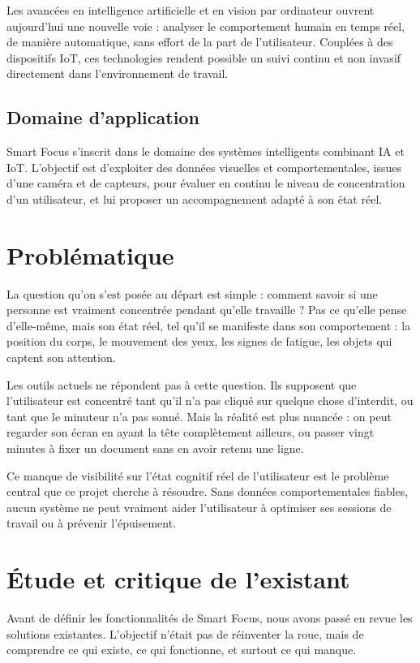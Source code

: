 Les avancées en intelligence artificielle et en vision par ordinateur ouvrent aujourd'hui une nouvelle voie : analyser le comportement humain en temps réel, de manière automatique, sans effort de la part de l'utilisateur. Couplées à des dispositifs IoT, ces technologies rendent possible un suivi continu et non invasif directement dans l'environnement de travail.

\subsection{Domaine d'application}
Smart Focus s'inscrit dans le domaine des systèmes intelligents combinant \ac{IA} et \ac{IoT}. L'objectif est d'exploiter des données visuelles et comportementales, issues d'une caméra et de capteurs, pour évaluer en continu le niveau de concentration d'un utilisateur, et lui proposer un accompagnement adapté à son état réel.

\section{Problématique}
La question qu'on s'est posée au départ est simple : comment savoir si une personne est vraiment concentrée pendant qu'elle travaille ? Pas ce qu'elle pense d'elle-même, mais son état réel, tel qu'il se manifeste dans son comportement : la position du corps, le mouvement des yeux, les signes de fatigue, les objets qui captent son attention.

Les outils actuels ne répondent pas à cette question. Ils supposent que l'utilisateur est concentré tant qu'il n'a pas cliqué sur quelque chose d'interdit, ou tant que le minuteur n'a pas sonné. Mais la réalité est plus nuancée : on peut regarder son écran en ayant la tête complètement ailleurs, ou passer vingt minutes à fixer un document sans en avoir retenu une ligne.

Ce manque de visibilité sur l'état cognitif réel de l'utilisateur est le problème central que ce projet cherche à résoudre. Sans données comportementales fiables, aucun système ne peut vraiment aider l'utilisateur à optimiser ses sessions de travail ou à prévenir l'épuisement.
\section{Étude et critique de l'existant}

Avant de définir les fonctionnalités de Smart Focus, nous avons passé en revue les solutions existantes. L’objectif n’était pas de réinventer la roue, mais de comprendre ce qui existe, ce qui fonctionne, et surtout ce qui manque.

